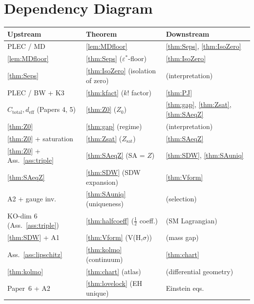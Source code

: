 \documentclass[11pt,a4paper]{article}
\theoremstyle{definition}
\newcommand{\epsstar}{\varepsilon^{\ast}}
\newcommand{\Ctot}{C_{\mathrm{total}}}
\newcommand{\deff}{d_{\mathrm{eff}}}
\begin{document}
\section{Dependency Diagram}\label{app:dep}

\begin{center}\small
\renewcommand{\arraystretch}{1.3}
\begin{tabular}{@{}p{3cm}p{8cm}p{3cm}@{}}
\toprule
\textbf{Upstream} & \textbf{Theorem} & \textbf{Downstream}\\
\midrule
PLEC / MD                        & \ref{lem:MDfloor}                           & \ref{thm:Seps}, \ref{thm:IsoZero}\\
\ref{lem:MDfloor}                & \ref{thm:Seps} ($\epsstar$-floor)           & \ref{thm:IsoZero}\\
\ref{thm:Seps}                   & \ref{thm:IsoZero} (isolation of zero)       & (interpretation)\\
PLEC / BW + K3                   & \ref{thm:kfact} ($k!$ factor)               & \ref{thm:PJ}\\
$\Ctot, \deff$ (Papers 4, 5)      & \ref{thm:Z0} ($Z_0$)                         & \ref{thm:gap}, \ref{thm:Zsat}, \ref{thm:SAeqZ}\\
\ref{thm:Z0}                     & \ref{thm:gap} (regime)                       & (interpretation)\\
\ref{thm:Z0} + saturation         & \ref{thm:Zsat} ($Z_{\mathrm{sat}}$)          & \ref{thm:SAeqZ}\\
\ref{thm:Z0} + Ass.~\ref{ass:triple} & \ref{thm:SAeqZ} (SA = $Z$)                & \ref{thm:SDW}, \ref{thm:SAuniq}\\
\ref{thm:SAeqZ}                  & \ref{thm:SDW} (SDW expansion)                & \ref{thm:Vform}\\
A2 + gauge inv.                   & \ref{thm:SAuniq} (uniqueness)                & (selection)\\
KO-dim 6 (Ass.~\ref{ass:triple}) & \ref{thm:halfcoeff} ($\tfrac12$ coeff.)      & (SM Lagrangian)\\
\ref{thm:SDW} + A1               & \ref{thm:Vform} (V(H,$\sigma$))              & (mass gap)\\
Ass.~\ref{ass:lipschitz}         & \ref{thm:kolmo} (continuum)                  & \ref{thm:chart}\\
\ref{thm:kolmo}                  & \ref{thm:chart} (atlas)                      & (differential geometry)\\
Paper~6 + A2                     & \ref{thm:lovelock} (EH unique)               & Einstein eqs.\\

\end{tabular}
\end{center}
\end{document}
